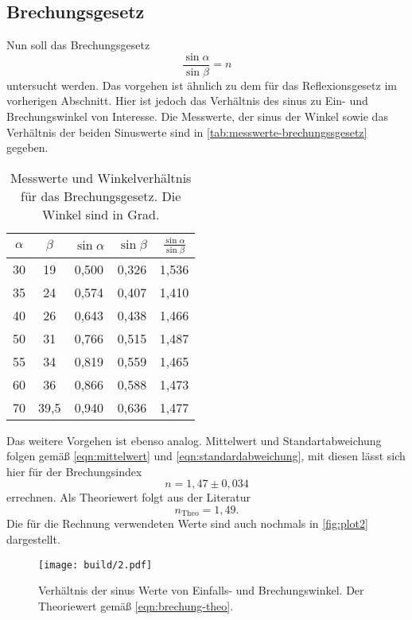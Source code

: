 \subsection{Brechungsgesetz}
\label{sec:Brechungsgesetz}
Nun soll das Brechungsgesetz
\begin{equation}
	\frac{\sin\alpha}{\sin\beta} = n
	\label{eqn:ausw:brechungsgesetz}
\end{equation}
untersucht werden. Das vorgehen ist ähnlich zu dem für das Reflexionsgesetz im vorherigen
Abschnitt. Hier ist jedoch das Verhältnis des sinus zu Ein- und Brechungswinkel von
Interesse. Die Messwerte, der sinus der Winkel sowie das Verhältnis der beiden Sinuswerte
sind in \autoref{tab:messwerte-brechungssgesetz} gegeben.
\begin{table}
	\centering
	\caption{Messwerte und Winkelverhältnis für das Brechungsgesetz. Die Winkel sind
	in Grad.}
	\label{tab:messwerte-brechungssgesetz}
	\begin{tabular}{c c c c c}
		\toprule
		$\alpha$ &
		$\beta$ &
		$\sin\alpha$ &
		$\sin\beta$ &
		$\frac{\sin\alpha}{\sin\beta}$ \\
		\midrule
		30 & 19   & 0,500 & 0,326 & 1,536	\\
		35 & 24   & 0,574 & 0,407 & 1,410	\\
		40 & 26   & 0,643 & 0,438 & 1,466	\\
		50 & 31   & 0,766 & 0,515 & 1,487	\\
		55 & 34   & 0,819 & 0,559 & 1,465	\\
		60 & 36   & 0,866 & 0,588 & 1,473	\\
		70 & 39,5 & 0,940 & 0,636 & 1,477	\\
		\bottomrule
	\end{tabular}
\end{table}
Das weitere Vorgehen ist ebenso analog. Mittelwert und Standartabweichung folgen gemäß
\autoref{eqn:mittelwert} und \autoref{eqn:standardabweichung}, mit diesen lässt sich hier
für der Brechungsindex
\begin{equation}
	n = 1,47 \pm 0,034
	\label{eqn:brechung-exp}
\end{equation}
errechnen. Als Theoriewert folgt aus der Literatur \cite{cosmos-indirekt}
\begin{equation}
	n_\text{Theo} = 1,49.
	\label{eqn:brechung-theo}
\end{equation}
Die für die Rechnung verwendeten Werte sind auch nochmals in \autoref{fig:plot2} dargestellt.
\begin{figure}[H]
	\centering
	\texttt{[image: build/2.pdf]}
	\caption{Verhältnis der sinus Werte von Einfalls- und Brechungswinkel. Der
	Theoriewert gemäß \autoref{eqn:brechung-theo}.}
	\label{fig:plot2}
\end{figure}

